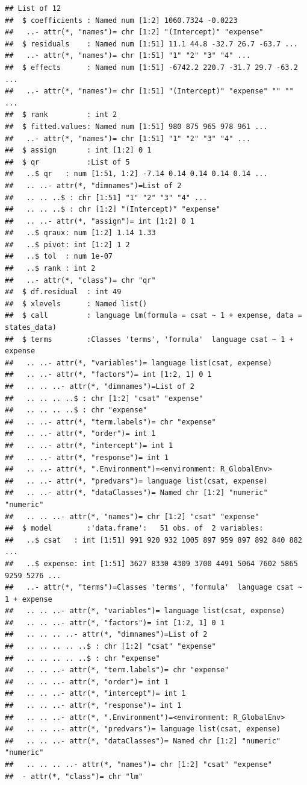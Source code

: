 \documentclass[]{book}
\begin{document}
\begin{verbatim}
## List of 12
##  $ coefficients : Named num [1:2] 1060.7324 -0.0223
##   ..- attr(*, "names")= chr [1:2] "(Intercept)" "expense"
##  $ residuals    : Named num [1:51] 11.1 44.8 -32.7 26.7 -63.7 ...
##   ..- attr(*, "names")= chr [1:51] "1" "2" "3" "4" ...
##  $ effects      : Named num [1:51] -6742.2 220.7 -31.7 29.7 -63.2 ...
##   ..- attr(*, "names")= chr [1:51] "(Intercept)" "expense" "" "" ...
##  $ rank         : int 2
##  $ fitted.values: Named num [1:51] 980 875 965 978 961 ...
##   ..- attr(*, "names")= chr [1:51] "1" "2" "3" "4" ...
##  $ assign       : int [1:2] 0 1
##  $ qr           :List of 5
##   ..$ qr   : num [1:51, 1:2] -7.14 0.14 0.14 0.14 0.14 ...
##   .. ..- attr(*, "dimnames")=List of 2
##   .. .. ..$ : chr [1:51] "1" "2" "3" "4" ...
##   .. .. ..$ : chr [1:2] "(Intercept)" "expense"
##   .. ..- attr(*, "assign")= int [1:2] 0 1
##   ..$ qraux: num [1:2] 1.14 1.33
##   ..$ pivot: int [1:2] 1 2
##   ..$ tol  : num 1e-07
##   ..$ rank : int 2
##   ..- attr(*, "class")= chr "qr"
##  $ df.residual  : int 49
##  $ xlevels      : Named list()
##  $ call         : language lm(formula = csat ~ 1 + expense, data = states_data)
##  $ terms        :Classes 'terms', 'formula'  language csat ~ 1 + expense
##   .. ..- attr(*, "variables")= language list(csat, expense)
##   .. ..- attr(*, "factors")= int [1:2, 1] 0 1
##   .. .. ..- attr(*, "dimnames")=List of 2
##   .. .. .. ..$ : chr [1:2] "csat" "expense"
##   .. .. .. ..$ : chr "expense"
##   .. ..- attr(*, "term.labels")= chr "expense"
##   .. ..- attr(*, "order")= int 1
##   .. ..- attr(*, "intercept")= int 1
##   .. ..- attr(*, "response")= int 1
##   .. ..- attr(*, ".Environment")=<environment: R_GlobalEnv> 
##   .. ..- attr(*, "predvars")= language list(csat, expense)
##   .. ..- attr(*, "dataClasses")= Named chr [1:2] "numeric" "numeric"
##   .. .. ..- attr(*, "names")= chr [1:2] "csat" "expense"
##  $ model        :'data.frame':   51 obs. of  2 variables:
##   ..$ csat   : int [1:51] 991 920 932 1005 897 959 897 892 840 882 ...
##   ..$ expense: int [1:51] 3627 8330 4309 3700 4491 5064 7602 5865 9259 5276 ...
##   ..- attr(*, "terms")=Classes 'terms', 'formula'  language csat ~ 1 + expense
##   .. .. ..- attr(*, "variables")= language list(csat, expense)
##   .. .. ..- attr(*, "factors")= int [1:2, 1] 0 1
##   .. .. .. ..- attr(*, "dimnames")=List of 2
##   .. .. .. .. ..$ : chr [1:2] "csat" "expense"
##   .. .. .. .. ..$ : chr "expense"
##   .. .. ..- attr(*, "term.labels")= chr "expense"
##   .. .. ..- attr(*, "order")= int 1
##   .. .. ..- attr(*, "intercept")= int 1
##   .. .. ..- attr(*, "response")= int 1
##   .. .. ..- attr(*, ".Environment")=<environment: R_GlobalEnv> 
##   .. .. ..- attr(*, "predvars")= language list(csat, expense)
##   .. .. ..- attr(*, "dataClasses")= Named chr [1:2] "numeric" "numeric"
##   .. .. .. ..- attr(*, "names")= chr [1:2] "csat" "expense"
##  - attr(*, "class")= chr "lm"
\end{verbatim}
\end{document}
